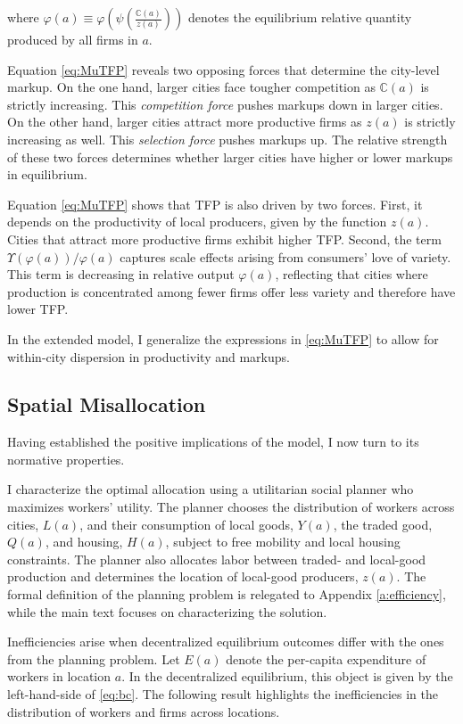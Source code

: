 where $\varphi(a) \equiv \varphi\left(\psi\left(\frac{\mathbb{C}(a)}{z(a)}\right)\right)$ denotes the equilibrium relative quantity produced by all firms in $a$.

Equation \eqref{eq:MuTFP} reveals two opposing forces that determine the city-level markup. On the one hand, larger cities face tougher competition as $\mathbb{C}(a)$ is strictly increasing. This \textit{competition force} pushes markups down in larger cities. On the other hand, larger cities attract more productive firms as $z(a)$ is strictly increasing as well. This \textit{selection force} pushes markups up. The relative strength of these two forces determines whether larger cities have higher or lower markups in equilibrium.

Equation \eqref{eq:MuTFP} shows that TFP is also driven by two forces. First, it depends on the productivity of local producers, given by the function $z(a)$. Cities that attract more productive firms exhibit higher TFP. Second, the term $\Upsilon\left(\varphi(a)\right)/\varphi(a)$ captures scale effects arising from consumers' love of variety. This term is decreasing in relative output $\varphi(a)$, reflecting that cities where production is concentrated among fewer firms offer less variety and therefore have lower TFP.

In the extended model, I generalize the expressions in \eqref{eq:MuTFP} to allow for within-city dispersion in productivity and markups.

\subsection{Spatial Misallocation}\label{s:efficiency}
Having established the positive implications of the model, I now turn to its normative properties.

I characterize the optimal allocation using a utilitarian social planner who maximizes workers’ utility. The planner chooses the distribution of workers across cities, $L(a)$, and their consumption of local goods, $Y(a)$, the traded good, $Q(a)$, and housing, $H(a)$, subject to free mobility and local housing constraints. The planner also allocates labor between traded- and local-good production and determines the location of local-good producers, $z(a)$. The formal definition of the planning problem is relegated to Appendix \ref{a:efficiency}, while the main text focuses on characterizing the solution. 

Inefficiencies arise when decentralized equilibrium outcomes differ with the ones from the planning problem. Let $E(a)$ denote the per-capita expenditure of workers in location $a$. In the decentralized equilibrium, this object is given by the left-hand-side of \eqref{eq:bc}. The following result highlights the inefficiencies in the distribution of workers and firms across locations. 

